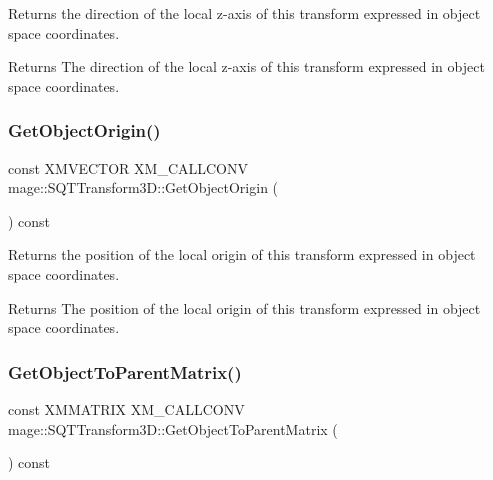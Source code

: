 Returns the direction of the local z-\/axis of this transform expressed in object space coordinates.

\begin{DoxyReturn}{Returns}
The direction of the local z-\/axis of this transform expressed in object space coordinates. 
\end{DoxyReturn}
\mbox{\label{classmage_1_1_s_q_t_transform3_d_aa289678aeaf11a182e89ce4eccf38b21}} 
\subsubsection{\texorpdfstring{Get\+Object\+Origin()}{GetObjectOrigin()}}
{\footnotesize\ttfamily const X\+M\+V\+E\+C\+T\+OR X\+M\+\_\+\+C\+A\+L\+L\+C\+O\+NV mage\+::\+S\+Q\+T\+Transform3\+D\+::\+Get\+Object\+Origin (\begin{DoxyParamCaption}{ }\end{DoxyParamCaption}) const\hspace{0.3cm}{\ttfamily [noexcept]}}

Returns the position of the local origin of this transform expressed in object space coordinates.

\begin{DoxyReturn}{Returns}
The position of the local origin of this transform expressed in object space coordinates. 
\end{DoxyReturn}
\mbox{\label{classmage_1_1_s_q_t_transform3_d_a4d4b8809174f1d23d4ca230d6744276e}} 
\subsubsection{\texorpdfstring{Get\+Object\+To\+Parent\+Matrix()}{GetObjectToParentMatrix()}}
{\footnotesize\ttfamily const X\+M\+M\+A\+T\+R\+IX X\+M\+\_\+\+C\+A\+L\+L\+C\+O\+NV mage\+::\+S\+Q\+T\+Transform3\+D\+::\+Get\+Object\+To\+Parent\+Matrix (\begin{DoxyParamCaption}{ }\end{DoxyParamCaption}) const\hspace{0.3cm}{\ttfamily [noexcept]}}


